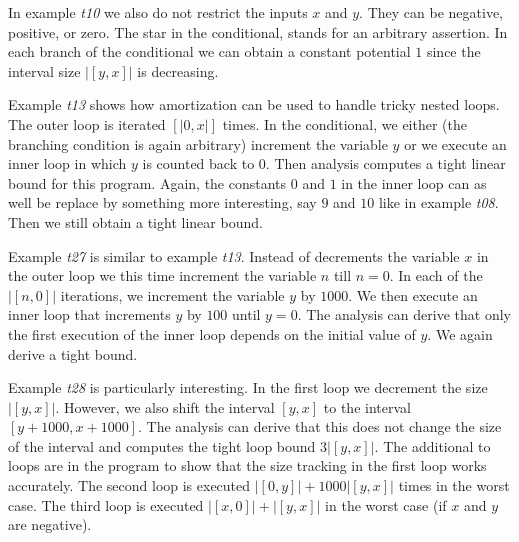 \documentclass[nocopyrightspace,preprint]{sigplanconf}
\begin{document}
In example \emph{t10} we also do not restrict the inputs $x$ and $y$.
They can be negative, positive, or zero.  The star {\tt *} in the
conditional, stands for an arbitrary assertion.  In each branch of the
conditional we can obtain a constant potential $1$ since the interval
size $|[y,x]|$ is decreasing.

Example \emph{t13} shows how amortization can be used to handle tricky
nested loops.  The outer loop is iterated $[|0,x|]$ times.  In the
conditional, we either (the branching condition is again arbitrary)
increment the variable $y$ or we execute an inner loop in which $y$ is
counted back to $0$.  Then analysis computes a tight linear bound for
this program.  Again, the constants $0$ and $1$ in the inner loop can
as well be replace by something more interesting, say $9$ and $10$
like in example \emph{t08}.  Then we still obtain a tight linear
bound.

Example \emph{t27} is similar to example \emph{t13}.  Instead of
decrements the variable $x$ in the outer loop we this time increment
the variable $n$ till $n = 0$.  In each of the $|[n,0]|$ iterations,
we increment the variable $y$ by $1000$.  We then execute an inner
loop that increments $y$ by $100$ until $y=0$.  The analysis can
derive that only the first execution of the inner loop depends on the
initial value of $y$.  We again derive a tight bound.

Example \emph{t28} is particularly interesting.  In the first loop we
decrement the size $|[y,x]|$.  However, we also shift the interval
$[y,x]$ to the interval $[y+1000,x+1000]$.  The analysis can derive
that this does not change the size of the interval and computes the
tight loop bound $3|[y,x]|$.  The additional to loops are in the
program to show that the size tracking in the first loop works
accurately.  The second loop is executed $|[0,y]| + 1000|[y,x]|$ times
in the worst case.  The third loop is executed $|[x,0]| + |[y,x]|$ in
the worst case (if $x$ and $y$ are negative).












\end{document}
